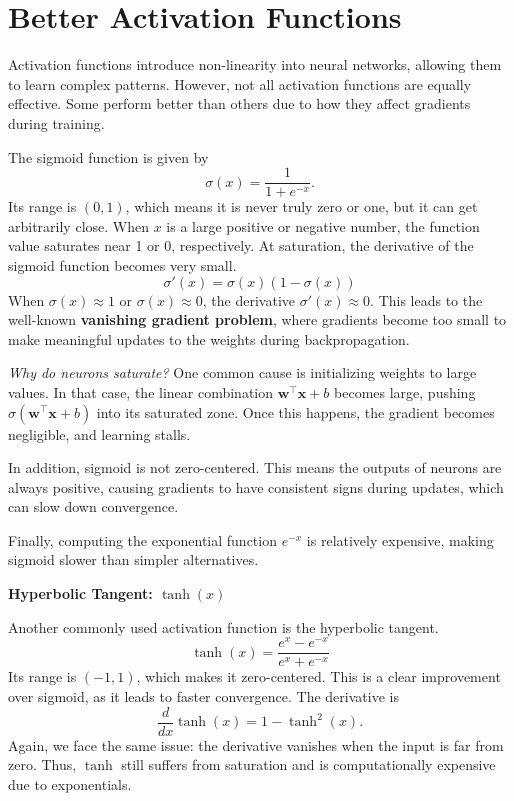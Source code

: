 \section{Better Activation Functions}

Activation functions introduce non-linearity into neural networks, allowing them to learn complex patterns. However, not all activation functions are equally effective. Some perform better than others due to how they affect gradients during training.

The sigmoid function is given by
\[
\sigma(x) = \frac{1}{1 + e^{-x}}.
\]
Its range is $(0, 1)$, which means it is never truly zero or one, but it can get arbitrarily close. When $x$ is a large positive or negative number, the function value saturates near 1 or 0, respectively.
At saturation, the derivative of the sigmoid function becomes very small.
\[
\sigma'(x) = \sigma(x) (1 - \sigma(x))
\]
When $\sigma(x) \approx 1$ or $\sigma(x) \approx 0$, the derivative $\sigma'(x) \approx 0$. This leads to the well-known \textbf{vanishing gradient problem}, where gradients become too small to make meaningful updates to the weights during backpropagation.

\textit{Why do neurons saturate?} One common cause is initializing weights to large values. In that case, the linear combination $\boldsymbol{w}^\top \boldsymbol{x} + b$ becomes large, pushing $\sigma(\boldsymbol{w}^\top \boldsymbol{x} + b)$ into its saturated zone. Once this happens, the gradient becomes negligible, and learning stalls.

In addition, sigmoid is not zero-centered. This means the outputs of neurons are always positive, causing gradients to have consistent signs during updates, which can slow down convergence.

Finally, computing the exponential function $e^{-x}$ is relatively expensive, making sigmoid slower than simpler alternatives.

\textbf{Hyperbolic Tangent: $\tanh(x)$}

Another commonly used activation function is the hyperbolic tangent.
\[
\tanh(x) = \frac{e^x - e^{-x}}{e^x + e^{-x}}
\]
Its range is $(-1, 1)$, which makes it zero-centered. This is a clear improvement over sigmoid, as it leads to faster convergence.
The derivative is
\[
\frac{d}{dx}\tanh(x) = 1 - \tanh^2(x). 
\]
Again, we face the same issue: the derivative vanishes when the input is far from zero. Thus, $\tanh$ still suffers from saturation and is computationally expensive due to exponentials.


